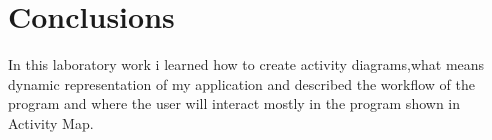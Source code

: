 \section*{Conclusions}
In this laboratory work i learned how to create activity diagrams,what means dynamic representation of my application and described the workflow of the program and where the user will interact mostly in the program shown in Activity Map.
\clearpage